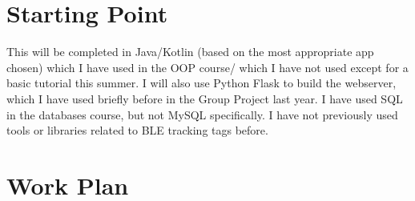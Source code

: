 \documentclass{article}
\begin{document}
\section{Starting Point}


This will be completed in Java/Kotlin (based on the most appropriate app chosen) which I have used in the OOP course/ which I have not used except for a basic tutorial this summer.
I will also use Python Flask to build the webserver, which I have used briefly before in the Group Project last year. I have used SQL in the databases course, but not MySQL specifically. I have not previously used tools or libraries related to BLE tracking tags before.
\pagebreak
\section{Work Plan}
\end{document}
